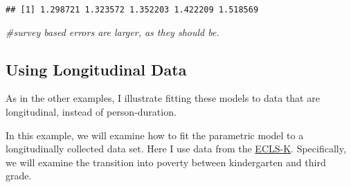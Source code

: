 \documentclass[
]{article}
\newenvironment{Shaded}{\begin{snugshade}}{\end{snugshade}}
\newcommand{\CommentTok}[1]{\textcolor[rgb]{0.56,0.35,0.01}{\textit{#1}}}
\newcommand{\DataTypeTok}[1]{\textcolor[rgb]{0.13,0.29,0.53}{#1}}
\newcommand{\DecValTok}[1]{\textcolor[rgb]{0.00,0.00,0.81}{#1}}
\newcommand{\FloatTok}[1]{\textcolor[rgb]{0.00,0.00,0.81}{#1}}
\newcommand{\KeywordTok}[1]{\textcolor[rgb]{0.13,0.29,0.53}{\textbf{#1}}}
\newcommand{\NormalTok}[1]{#1}
\newcommand{\OperatorTok}[1]{\textcolor[rgb]{0.81,0.36,0.00}{\textbf{#1}}}
\newcommand{\StringTok}[1]{\textcolor[rgb]{0.31,0.60,0.02}{#1}}
\begin{document}
\begin{Shaded}
\end{Shaded}

\begin{verbatim}
## [1] 1.298721 1.323572 1.352203 1.422209 1.518569
\end{verbatim}

\begin{Shaded}
\begin{Highlighting}[]
\CommentTok{#survey based errors are larger, as they should be.}
\end{Highlighting}
\end{Shaded}

\hypertarget{using-longitudinal-data}{%
\subsection{Using Longitudinal Data}\label{using-longitudinal-data}}

As in the other examples, I illustrate fitting these models to data that
are longitudinal, instead of person-duration.

In this example, we will examine how to fit the parametric model to a
longitudinally collected data set. Here I use data from the
\href{http://nces.ed.gov/ecls/kinderdatainformation.asp}{ECLS-K}.
Specifically, we will examine the transition into poverty between
kindergarten and third grade.
\end{document}
